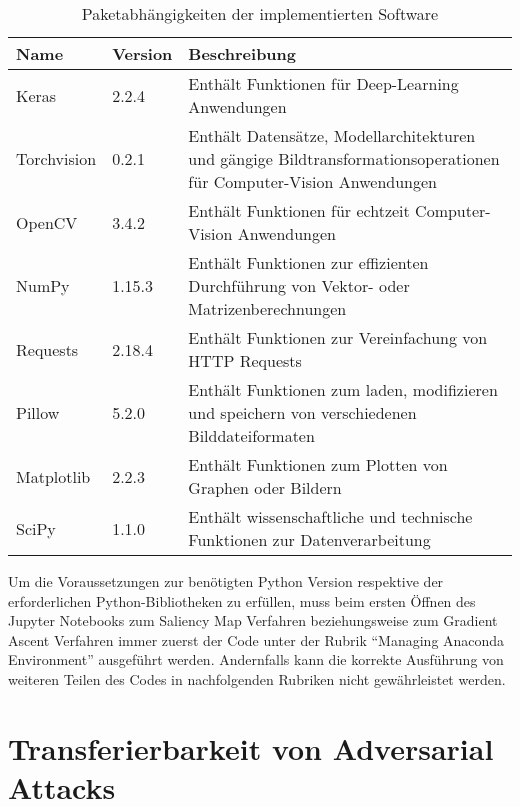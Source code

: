 \begin{table}
	\centering
	\begin{tabular}{|l|l|p{10.4cm}|}
		\hline 
		Name & Version & Beschreibung \\ 
		\hline\hline 
		Keras& 2.2.4  & Enthält Funktionen für Deep-Learning Anwendungen \cite{noauthor_home_nodate} \\ 
		\hline 
		Torchvision& 0.2.1 & Enthält Datensätze, Modellarchitekturen und gängige Bildtransformationsoperationen für Computer-Vision Anwendungen \cite{team_torchvision:_nodate} \\ 
		\hline 
		OpenCV& 3.4.2  & Enthält Funktionen für echtzeit Computer-Vision Anwendungen \cite{noauthor_opencv_nodate} \\ 
		\hline 
		NumPy&  1.15.3& Enthält Funktionen zur effizienten Durchführung von Vektor- oder Matrizenberechnungen \cite{noauthor_numpy_nodate} \\ 
		\hline 
		Requests& 2.18.4 & Enthält Funktionen zur Vereinfachung von HTTP Requests \cite{noauthor_requests:_nodate} \\ 
		\hline 
		Pillow& 5.2.0 & Enthält Funktionen zum laden, modifizieren und speichern von verschiedenen Bilddateiformaten \cite{noauthor_pillow_nodate} \\ 
		\hline 
		Matplotlib& 2.2.3 & Enthält Funktionen zum Plotten von Graphen oder Bildern \cite{noauthor_matplotlib:_nodate} \\ 
		\hline 
		SciPy& 1.1.0  & Enthält wissenschaftliche und technische Funktionen zur Datenverarbeitung \cite{noauthor_scipy.org_nodate} \\ 
		\hline 
	\end{tabular} 
	\caption{Paketabhängigkeiten der implementierten Software}
	\label{tab:parameter}
\end{table}

Um die Voraussetzungen zur benötigten Python Version respektive der erforderlichen Python-Bibliotheken zu erfüllen, muss beim ersten Öffnen des Jupyter Notebooks zum Saliency Map Verfahren beziehungsweise zum Gradient Ascent Verfahren immer zuerst der Code unter der Rubrik “Managing Anaconda Environment” ausgeführt werden. Andernfalls kann die korrekte Ausführung von weiteren Teilen des Codes in nachfolgenden Rubriken nicht gewährleistet werden.

\section{Transferierbarkeit von Adversarial Attacks}


